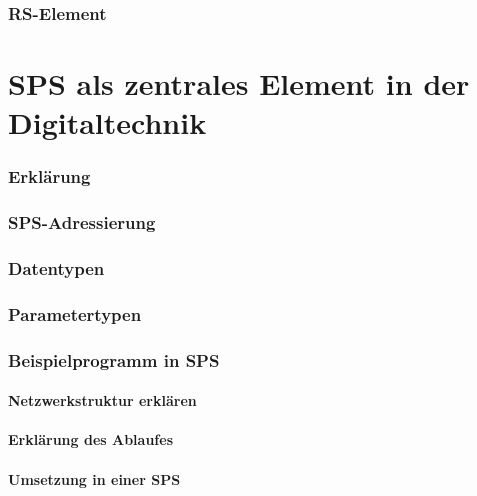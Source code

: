 	\subsection{RS-Element}\label{key: rsElement}
	\chapter{SPS als zentrales Element in der Digitaltechnik}
	\subsection{Erklärung}\label{kap: erklärungSPS}
	\subsection{SPS-Adressierung}\label{kap: sps-adress}
	\subsection{Datentypen}\label{kap: datentypen}
	\subsection{Parametertypen}\label{kap: parametertypen}
	\subsection{Beispielprogramm in SPS}\label{kap: bspSPS}
	\subsubsection{Netzwerkstruktur erklären}\label{kap: netzwerk}
	\subsubsection{Erklärung des Ablaufes}\label{kap: ablauf}
	\subsubsection{Umsetzung in einer SPS}\label{kap: umsetzung}
	\backmatter
	

	
	
